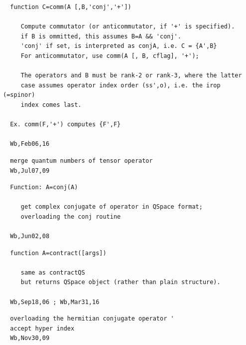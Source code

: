 \documentclass[twoside,12pt]{article}
\begin{document}
\begin{verbatim}
  function C=comm(A [,B,'conj','+'])
 
     Compute commutator (or anticommutator, if '+' is specified).
     if B is ommitted, this assumes B=A && 'conj'.
     'conj' if set, is interpreted as conjA, i.e. C = {A',B}
     For anticommutator, use comm(A [, B, cflag], '+');
 
     The operators and B must be rank-2 or rank-3, where the latter
     case assumes operator index order (ss',o), i.e. the irop (=spinor)
     index comes last.
 
  Ex. comm(F,'+') computes {F',F}
 
  Wb,Feb06,16
\end{verbatim}

\pagebreak[3]



\begin{verbatim}
  merge quantum numbers of tensor operator
  Wb,Jul07,09
\end{verbatim}

\pagebreak[3]



\begin{verbatim}
  Function: A=conj(A)
 
     get complex conjugate of operator in QSpace format;
     overloading the conj routine
 
  Wb,Jun02,08
\end{verbatim}

\pagebreak[3]



\begin{verbatim}
  function A=contract([args])
 
     same as contractQS
     but returns QSpace object (rather than plain structure).
 
  Wb,Sep18,06 ; Wb,Mar31,16
\end{verbatim}

\pagebreak[3]



\begin{verbatim}
  overloading the hermitian conjugate operator '
  accept hyper index
  Wb,Nov30,09
\end{verbatim}

\pagebreak[3]


\end{document}
